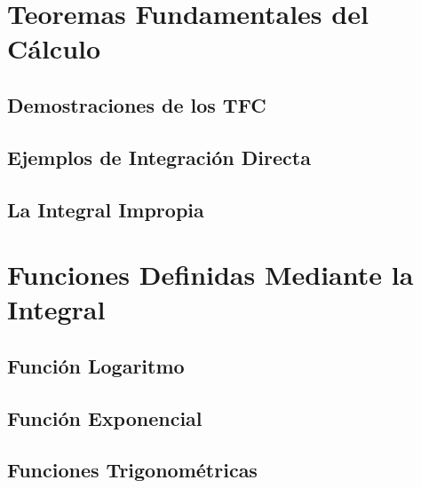 	\chapter{Teoremas Fundamentales del Cálculo} %
	\label{cha:teoremas_fundamentales_del_cálculo}
		\section{Demostraciones de los TFC} %
		\label{sec:demostraciones_de_los_tfc}
			
		\section{Ejemplos de Integración Directa} %
		\label{sec:ejemplos_de_integración_directa}
			
		\section{La Integral Impropia} %
		\label{sec:la_integral_impropia}
			
	\chapter{Funciones Definidas Mediante la Integral} %
	\label{cha:funciones_definidas_mediante_la_integral}
		\section{Función Logaritmo} %
		\label{sec:funcion_logaritmo}
			
		\section{Función Exponencial} %
		\label{sec:función_exponencial}
			
		\section{Funciones Trigonométricas} %
		\label{sec:funciones_trigonométricas}
		
